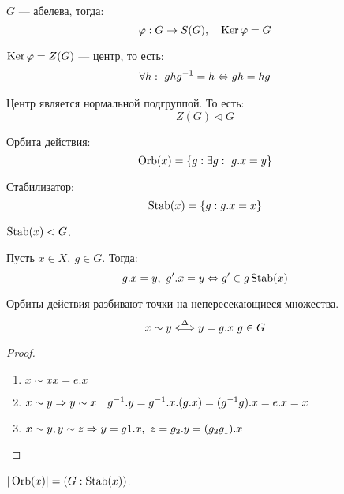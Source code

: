 \begin{proposition}
  $G$ --- абелева, тогда:
  \[\varphi : G \rightarrow S(G), \quad \operatorname{Ker} \varphi = G\]
\end{proposition}

\begin{definition}
  $\operatorname{Ker} \varphi = Z(G)$ --- центр, то есть:
  \begin{gather}
    \forall h: \ ghg^{-1} = h \Leftrightarrow gh = hg
  \end{gather}
\end{definition}

\begin{corollary}
  Центр является нормальной подгруппой. То есть:
  \[Z(G) \vartriangleleft G \]
\end{corollary}

\begin{definition}
  Орбита действия:
  \[\operatorname{Orb} (x) = \{ g: \exists g: \ g.x = y \}\]
\end{definition}

\begin{definition}
  Стабилизатор:
  \[\operatorname{Stab} (x) = \{ g: g.x = x \}\]
\end{definition}

\begin{proposition}
  $\operatorname{Stab} (x) < G$.
\end{proposition}

\begin{example}
  Пусть $x \in X, \ g \in G$. Тогда:
  \[ g.x = y, \ g'.x = y \Leftrightarrow g' \in g \operatorname{Stab} (x) \]
\end{example}

\begin{lemma}
  Орбиты действия разбивают точки на непересекающиеся множества.
  \[x \sim y \stackrel{\Delta}{\Longleftrightarrow} y = g.x \ g \in G\]
\end{lemma}

\begin{proof}~
  \begin{enumerate}
    \item $x \sim x x = e.x$ 
    \item $x \sim y \Rightarrow y \sim x \quad g^{-1}.y = g^{-1}.x .(g.x) = (g^{-1} g).x = e.x = x$ 
    \item $x \sim y, y \sim z \Rightarrow y = g1.x, \ z = g_2.y = (g_2 g_1).x$
  \end{enumerate}
\end{proof}

\begin{theorem}[Лагранжа]
  $|\operatorname{Orb} (x)| = (G : \operatorname{Stab} (x))$.
\end{theorem}

